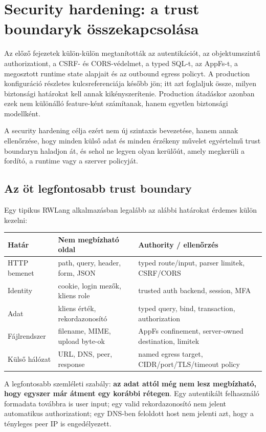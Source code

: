 \chapter{Security hardening: a trust boundaryk összekapcsolása}

Az előző fejezetek külön-külön megtanították az autentikációt, az objektumszintű authorizationt, a CSRF- és CORS-védelmet, a typed SQL-t, az AppFs-t, a megosztott runtime state alapjait és az outbound egress policyt. A production konfiguráció részletes kulcsreferenciája később jön; itt azt foglaljuk össze, milyen biztonsági határokat kell annak kikényszerítenie. Production átadáskor azonban ezek nem különálló feature-ként számítanak, hanem egyetlen biztonsági modellként.

A security hardening célja ezért nem új szintaxis bevezetése, hanem annak ellenőrzése, hogy minden külső adat és minden érzékeny művelet egyértelmű trust boundaryn haladjon át, és sehol ne legyen olyan kerülőút, amely megkerüli a fordító, a runtime vagy a szerver policyját.

\section{Az öt legfontosabb trust boundary}

Egy tipikus RWLang alkalmazásban legalább az alábbi határokat érdemes külön kezelni:

\begin{longtable}{L{0.25\textwidth}L{0.31\textwidth}L{0.34\textwidth}}
\toprule
Határ & Nem megbízható oldal & Authority / ellenőrzés \\
\midrule
HTTP bemenet & path, query, header, form, JSON & typed route/input, parser limitek, CSRF/CORS \\
Identity & cookie, login mezők, kliens role & trusted auth backend, session, MFA \\
Adat & kliens érték, rekordazonosító & typed query, bind, transaction, authorization \\
Fájlrendszer & filename, MIME, upload byte-ok & AppFs confinement, server-owned destination, limitek \\
Külső hálózat & URL, DNS, peer, response & named egress target, CIDR/port/TLS/timeout policy \\
\bottomrule
\end{longtable}

A legfontosabb szemléleti szabály: \textbf{az adat attól még nem lesz megbízható, hogy egyszer már átment egy korábbi rétegen}. Egy autentikált felhasználó formadata továbbra is user input; egy valid rekordazonosító nem jelent automatikus authorizationt; egy DNS-ben feloldott host nem jelenti azt, hogy a tényleges peer IP is engedélyezett.

